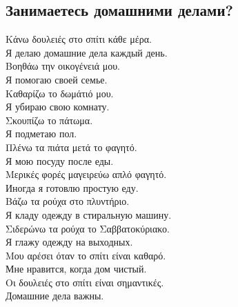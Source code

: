 \documentclass[12pt]{article}
\newcommand{\my}[1]{\textcolor{gray!80!white}{#1}}
\newenvironment{page}{\clearpage\normalsize\null\vfill}{\vfill\null}
\newenvironment{textblock}{\begin{minipage}{\textwidth}}{\end{minipage}\smallskip}
\begin{document}
	\begin{page}
		\subsection{Занимаетесь домашними делами?}

		\begin{textblock}
			Κάνω δουλειές στο σπίτι κάθε μέρα.\\
            \my{Я делаю домашние дела каждый день.}\\
			Βοηθάω την οικογένειά μου. \\
            \my{Я помогаю своей семье.}\\
			Καθαρίζω το δωμάτιό μου. \\
            \my{Я убираю свою комнату.}\\
			Σκουπίζω το πάτωμα.\\
			\my{Я подметаю пол.}\\
			Πλένω τα πιάτα μετά το φαγητό.\\
            \my{Я мою посуду после еды.}\\
			Μερικές φορές μαγειρεύω απλό φαγητό.\\
            \my{Иногда я готовлю простую еду.}\\
			Βάζω τα ρούχα στο πλυντήριο. \\
            \my{Я кладу одежду в стиральную машину.}\\
			Σιδερώνω τα ρούχα το Σαββατοκύριακο.\\
			\my{Я глажу одежду на выходных.}\\
			Μου αρέσει όταν το σπίτι είναι καθαρό. \\
            \my{Мне нравится, когда дом чистый.}\\
			Οι δουλειές στο σπίτι είναι σημαντικές.\\
            \my{Домашние дела важны.}\\
		\end{textblock}
	\end{page}
\end{document}
